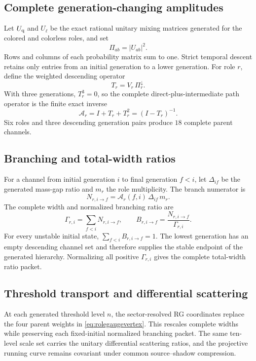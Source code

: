 \documentclass[11pt]{article}
\numberwithin{equation}{section}
\theoremstyle{remark}
\begin{document}
\subsection{Complete generation-changing amplitudes}
Let $U_{\rm q}$ and $U_{\ell}$ be the exact rational unitary mixing matrices generated for the colored and colorless roles, and set
\begin{equation}
\Pi_{ab}=|U_{ab}|^2.
\end{equation}
Rows and columns of each probability matrix sum to one. Strict temporal descent retains only entries from an initial generation to a lower generation. For role $r$, define the weighted descending operator
\begin{equation}
T_r=V_r\,\Pi_r^{\downarrow}.
\end{equation}
With three generations, $T_r^3=0$, so the complete direct-plus-intermediate path operator is the finite exact inverse
\begin{equation}
\mathcal A_r=I+T_r+T_r^2=(I-T_r)^{-1}.
\label{eq:finitepathsum}
\end{equation}
Six roles and three descending generation pairs produce $18$ complete parent channels.

\subsection{Branching and total-width ratios}
For a channel from initial generation $i$ to final generation $f<i$, let $\Delta_{if}$ be the generated mass-gap ratio and $m_r$ the role multiplicity. The branch numerator is
\begin{equation}
N_{r,i\to f}=\mathcal A_r(f,i)\,\Delta_{if}\,m_r.
\end{equation}
The complete width and normalized branching ratio are
\begin{equation}
\Gamma_{r,i}=\sum_{f<i}N_{r,i\to f},
\qquad
B_{r,i\to f}=\frac{N_{r,i\to f}}{\Gamma_{r,i}}.
\label{eq:branchingratio}
\end{equation}
For every unstable initial state, $\sum_{f<i}B_{r,i\to f}=1$. The lowest generation has an empty descending channel set and therefore supplies the stable endpoint of the generated hierarchy. Normalizing all positive $\Gamma_{r,i}$ gives the complete total-width ratio packet.

\subsection{Threshold transport and differential scattering}
At each generated threshold level $n$, the sector-resolved RG coordinates replace the four parent weights in \eqref{eq:rolegaugevertex}. This rescales complete widths while preserving each fixed-initial normalized branching packet. The same ten-level scale set carries the unitary differential scattering ratios, and the projective running curve remains covariant under common source--shadow compression.
\end{document}
